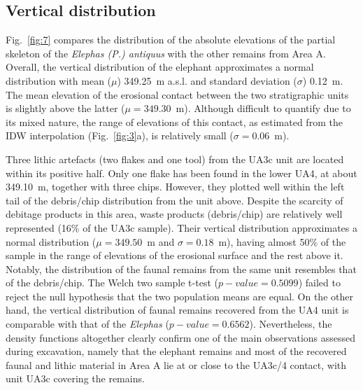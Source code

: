 \documentclass[preprint,authoryear,times]{elsarticle} %
\begin{document}
\subsection{Vertical distribution}



Fig.~\ref{fig:7} compares the distribution of the absolute elevations of the partial skeleton of the \emph{Elephas (P.) antiquus} with the other remains from Area A. Overall, the vertical distribution of the elephant approximates a normal distribution with mean ($\mu$) 349.25~m a.s.l. and standard deviation ($\sigma$) 0.12~m. The mean elevation of the erosional contact between the two stratigraphic units is slightly above the latter ($\mu=349.30$~m). Although difficult to quantify due to its mixed nature, the range of elevations of this contact, as estimated from the IDW interpolation (Fig.~\ref{fig:3}a), is relatively small ($\sigma=0.06$~m).

Three lithic artefacts (two flakes and one tool) from the UA3c unit are located within its positive half. Only one flake has been found in the lower UA4, at about 349.10~m, together with three chips. However, they plotted well within the left tail of the debris/chip distribution from the unit above. Despite the scarcity of debitage products in this area, waste products (debris/chip) are relatively well represented (16\% of the UA3c sample). Their vertical distribution approximates a normal distribution ($\mu=349.50$~m and $\sigma=0.18$~m), having almost 50\% of the sample in the range of elevations of the erosional surface and the rest above it. Notably, the distribution of the faunal remains from the same unit resembles that of the debris/chip. The Welch two sample t-test ($p-value=0.5099$) failed to reject the null hypothesis that the two population means are equal. On the other hand, the vertical distribution of faunal remains recovered from the UA4 unit is comparable with that of the \emph{Elephas} ($p-value=0.6562$).
Nevertheless, the density functions altogether clearly confirm one of the main observations assessed during excavation, namely that the elephant remains and most of the recovered faunal and lithic material in Area A lie at or close to the UA3c/4 contact, with unit UA3c covering the remains.
\end{document}

